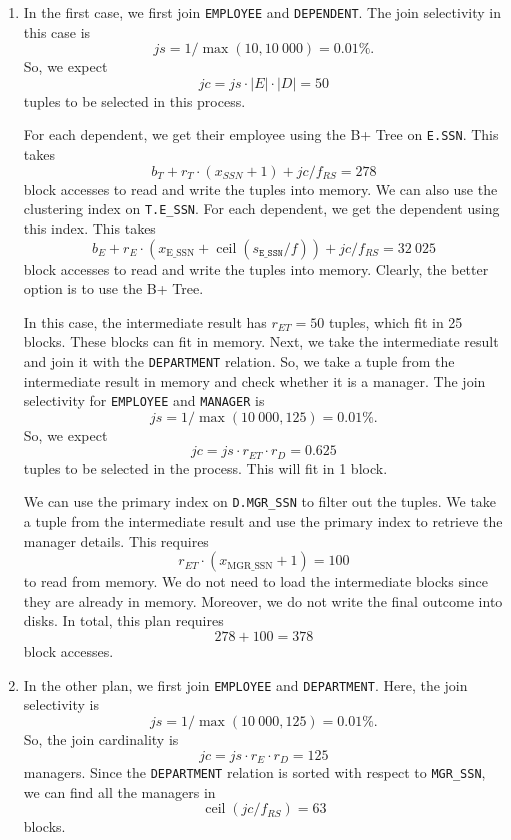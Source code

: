 \documentclass[a4paper, openany]{memoir}
\theoremstyle{definition}
\begin{document}
\begin{answer}
    \begin{enumerate}
        \item In the first case, we first join \texttt{EMPLOYEE} and \texttt{DEPENDENT}. The join selectivity in this case is
        \[\textit{js} = 1/\max(10, 10 \ 000) = 0.01\%.\]
        So, we expect
        \[\textit{jc} = \textit{js} \cdot |E| \cdot |D| = 50\]
        tuples to be selected in this process. 
        
        For each dependent, we get their employee using the B+ Tree on \texttt{E.SSN}. This takes
        \[b_T + r_T \cdot (x_{SSN} + 1) + \textit{jc}/f_{RS} = 278\]
        block accesses to read and write the tuples into memory. We can also use the clustering index on \texttt{T.E\_SSN}. For each dependent, we get the dependent using this index. This takes
        \[b_E + r_E \cdot (x_{\text{E\_SSN}} + \operatorname{ceil}(s_{\texttt{E\_SSN}} / f)) + \textit{jc}/f_{RS} = 32 \ 025\]
        block accesses to read and write the tuples into memory. Clearly, the better option is to use the B+ Tree.
        
        In this case, the intermediate result has $r_{ET} = 50$ tuples, which fit in 25 blocks. These blocks can fit in memory. Next, we take the intermediate result and join it with the \texttt{DEPARTMENT} relation. So, we take a tuple from the intermediate result in memory and check whether it is a manager. The join selectivity for \texttt{EMPLOYEE} and \texttt{MANAGER} is
        \[\textit{js} = 1/\max(10\ 000, 125) = 0.01\%.\]
        So, we expect
        \[\textit{jc} = \textit{js} \cdot r_{ET} \cdot r_D = 0.625\]
        tuples to be selected in the process. This will fit in 1 block. 
        
        We can use the primary index on \texttt{D.MGR\_SSN} to filter out the tuples. We take a tuple from the intermediate result and use the primary index to retrieve the manager details. This requires
        \[r_{ET} \cdot (x_{\text{MGR\_SSN}} + 1) = 100\]
        to read from memory. We do not need to load the intermediate blocks since they are already in memory. Moreover, we do not write the final outcome into disks. In total, this plan requires
        \[278 + 100 = 378\]
        block accesses.
        
        \item In the other plan, we first join \texttt{EMPLOYEE} and \texttt{DEPARTMENT}. Here, the join selectivity is
        \[\textit{js} = 1/\max(10 \ 000, 125) = 0.01\%.\]
        So, the join cardinality is
        \[\textit{jc} = \textit{js} \cdot r_E \cdot r_D = 125\]
        managers. Since the \texttt{DEPARTMENT} relation is sorted with respect to \texttt{MGR\_SSN}, we can find all the managers in
        \[\operatorname{ceil}(\textit{jc}/f_{RS}) = 63\]
        blocks.
        

\end{enumerate}
\end{answer}
\end{document}
